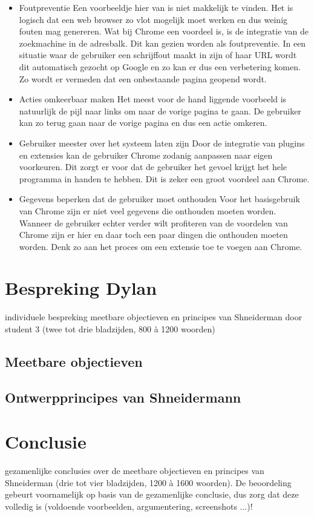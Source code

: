 \documentclass[11pt]{article}
\begin{document}
\begin{itemize}
\begin{figure}
  \label{fig:loading}
\end{figure}
\item Foutpreventie 
\newline
Een voorbeeldje hier van is niet makkelijk te vinden. Het is logisch dat een web browser zo vlot mogelijk moet werken en dus weinig fouten mag genereren. Wat bij Chrome een voordeel is, is de integratie van de zoekmachine in de adresbalk. Dit kan gezien worden als foutpreventie. In een situatie waar de gebruiker een schrijffout maakt in zijn of haar URL wordt dit automatisch gezocht op Google en zo kan er dus een verbetering komen. Zo wordt er vermeden dat een onbestaande pagina geopend wordt.
\item Acties omkeerbaar maken
\newline
Het meest voor de hand liggende voorbeeld is natuurlijk de pijl naar links om naar de vorige pagina te gaan. De gebruiker kan zo terug gaan naar de vorige pagina en dus een actie omkeren.
\item Gebruiker meester over het systeem laten zijn
\newline
Door de integratie van plugins en extensies kan de gebruiker Chrome zodanig aanpassen naar eigen voorkeuren. Dit zorgt er voor dat de gebruiker het gevoel krijgt het hele programma in handen te hebben. Dit is zeker een groot voordeel aan Chrome.
\item Gegevens beperken dat de gebruiker moet onthouden
\newline
Voor het basisgebruik van Chrome zijn er niet veel gegevens die onthouden moeten worden. Wanneer de gebruiker echter verder wilt profiteren van de voordelen van Chrome zijn er hier en daar toch een paar dingen die onthouden moeten worden. Denk zo aan het proces om een extensie toe te voegen aan Chrome.
\end{itemize}
\newpage

\section{Bespreking Dylan}
individuele bespreking meetbare objectieven en principes van Shneiderman door student 3 (twee tot drie bladzijden, 800 à 1200 woorden)
\subsection{Meetbare objectieven}
\subsection{Ontwerpprincipes van Shneidermann}
\newpage


\section{Conclusie}
gezamenlijke conclusies over de meetbare objectieven en principes van Shneiderman (drie tot vier bladzijden, 1200 à 1600 woorden). De beoordeling gebeurt voornamelijk op basis van de gezamenlijke conclusie, dus zorg dat deze volledig is (voldoende voorbeelden, argumentering, screenshots ...)!
\newpage
\end{document}
